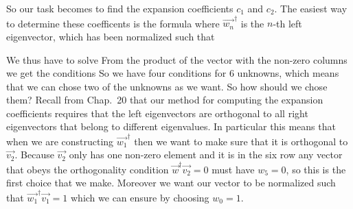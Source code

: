 So our task becomes to find the expansion coefficients $c_1$ and $c_2$. The easiest way to determine these coefficents is the formula 
where $\vec{w_n}^\dag$ is the $n$-th left eigenvector, which has been normalized such that 

We thus have to solve 
From the product of the vector with the non-zero columns we get the conditions  
So we have four conditions for 6 unknowns, which means that we can chose two of the unknowns as we want. So how should we chose them? Recall from Chap.~20 that our method for computing the expansion coefficients requires that the left eigenvectors are orthogonal to all right eigenvectors that belong to different eigenvalues. In particular this means that when we are constructing $\vec{w_1}^\dag$ then we want to make sure that it is orthogonal to $\vec{v_2}$. Because $\vec{v_2}$ only has one non-zero element and it is in the six row any vector that obeys the orthogonality condition $\vec{w}^\dag\vec{v_2}=0$ must have $w_5=0$, so this is the first choice that we make. Moreover we want our vector to be normalized such that $\vec{w_1}^\dag\vec{v_1}=1$ which we can ensure by choosing $w_0=1$. 

